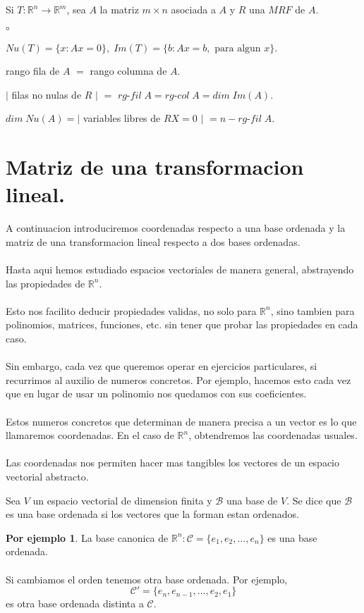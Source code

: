 \documentclass{article}
\theoremstyle{definition}
\theoremstyle{definition}
\newtheorem*{ej}{Por ejemplo}
\theoremstyle{remark}
\begin{document}
 Si $T : \mathbb{R}^n \to \mathbb{R}^m$, sea $A$ la matriz $m \times n$ asociada a $A$ y $R$ una $MRF$ de $A$. \begin{list}{$\circ$}{}  
 \item  $Nu(T)=\{x : Ax=0\}, \; Im(T)=\{b: Ax=b, \text{ para algun }x \}$. 
 \item rango fila de $A$ $=$ rango columna de $A$. 
 \item $|$ filas no nulas de $R$ $|$ $=$ $rg$-$fil\;A = rg$-$col \; A = dim \; Im(A)$.
 \item $dim \; Nu(A) = |$ variables libres de $RX=0$ $|$ $ = n-rg$-$fil\;A$.
\end{list}
\section{Matriz de una transformacion lineal.}
A continuacion introduciremos coordenadas respecto a una base ordenada y la matriz de una transformacion lineal respecto a dos bases ordenadas.\\\\
Hasta aqui hemos estudiado espacios vectoriales de manera general, abstrayendo las propiedades de $\mathbb{R}^n$.\\\\
Esto nos facilito deducir propiedades validas, no solo para $\mathbb{R}^n$, sino tambien para polinomios, matrices, funciones, etc. sin tener que probar las propiedades en cada caso. \\\\ Sin embargo, cada vez que queremos operar en ejercicios particulares, si recurrimos al auxilio de numeros concretos. Por ejemplo, hacemos esto cada vez que en lugar de usar un polinomio nos quedamos con sus coeficientes. \\\\ Estos numeros concretos que determinan de manera precisa a un vector es lo que llamaremos coordenadas. En el caso de $\mathbb{R}^n$, obtendremos las coordenadas usuales. \\\\ Las coordenadas nos permiten hacer mas tangibles los vectores de un espacio vectorial abstracto.
\begin{defi}
  Sea $V$ un espacio vectorial de dimension finita y $\mathcal{B}$ una base de $V$. Se dice que $\mathcal{B}$ es una base ordenada si los vectores que la forman estan ordenados.
\end{defi}
\begin{ej}
  La base canonica de $\mathbb{R}^n : \mathcal{C}=\{e_1,e_2,\dots ,e_n\}$ es una base ordenada. \\\\ Si cambiamos el orden tenemos otra base ordenada. Por ejemplo, \[
    \mathcal{C}'=\{e_n,e_{n-1},\dots ,e_2,e_1\}
  \]
  es otra base ordenada distinta a $\mathcal{C}$.
\end{ej}
\end{document}
